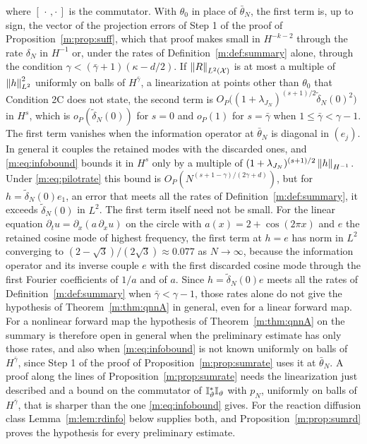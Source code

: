 \begin{remark}
where $[\,\cdot\,,\cdot\,]$ is the commutator. With $\theta_0$ in place of $\bar\theta_N$, the first term is, up to sign, the vector of the projection errors of Step 1 of the proof of Proposition~\ref{m:prop:suff}, which that proof makes small in $H^{-k-2}$ through the rate $\delta_N$ in $H^{-1}$ or, under the rates of Definition~\ref{m:def:summary} alone, through the condition $\gamma<(\bar\gamma+1)(\kappa-d/2)$. If $\left\|R\right\|_{L^2(\mathcal X)}$ is at most a multiple of $\left\|h\right\|^2_{L^2}$ uniformly on balls of $H^{\bar\gamma}$, a linearization at points other than $\theta_0$ that Condition 2C does not state, the second term is $O_P\big((1+\lambda_{J_N})^{(s+1)/2}\tilde\delta_N(0)^2\big)$ in $H^s$, which is $o_P(\tilde\delta_N(0))$ for $s=0$ and $o_P(1)$ for $s=\bar\gamma$ when $1\le\bar\gamma<\gamma-1$. The first term vanishes when the information operator at $\bar\theta_N$ is diagonal in $(e_j)$. In general it couples the retained modes with the discarded ones, and \eqref{m:eq:infobound} bounds it in $H^s$ only by a multiple of $(1+\lambda_{J_N})^{(s+1)/2}\left\|h\right\|_{H^{-1}}$. Under \eqref{m:eq:pilotrate} this bound is $O_P(N^{(s+1-\gamma)/(2\gamma+d)})$, but for $h=\tilde\delta_N(0)e_1$, an error that meets all the rates of Definition~\ref{m:def:summary}, it exceeds $\tilde\delta_N(0)$ in $L^2$. The first term itself need not be small. For the linear equation $\partial_tu=\partial_x(a\,\partial_xu)$ on the circle with $a(x)=2+\cos(2\pi x)$ and $e$ the retained cosine mode of highest frequency, the first term at $h=e$ has norm in $L^2$ converging to $(2-\sqrt3)/(2\sqrt3)\approx0.077$ as $N\to\infty$, because the information operator and its inverse couple $e$ with the first discarded cosine mode through the first Fourier coefficients of $1/a$ and of $a$. Since $h=\tilde\delta_N(0)e$ meets all the rates of Definition~\ref{m:def:summary} when $\bar\gamma<\gamma-1$, those rates alone do not give the hypothesis of Theorem~\ref{m:thm:qnnA} in general, even for a linear forward map. For a nonlinear forward map the hypothesis of Theorem~\ref{m:thm:qnnA} on the summary is therefore open in general when the preliminary estimate has only those rates, and also when \eqref{m:eq:infobound} is not known uniformly on balls of $H^{\bar\gamma}$, since Step 1 of the proof of Proposition~\ref{m:prop:sumrate} uses it at $\bar\theta_N$. A proof along the lines of Proposition~\ref{m:prop:sumrate} needs the linearization just described and a bound on the commutator of $\mathbb{I}^*_\vartheta\mathbb{I}_\vartheta$ with $p_N$, uniformly on balls of $H^{\bar\gamma}$, that is sharper than the one \eqref{m:eq:infobound} gives. For the reaction diffusion class Lemma~\ref{m:lem:rdinfo} below supplies both, and Proposition~\ref{m:prop:sumrd} proves the hypothesis for every preliminary estimate.
\end{remark}

